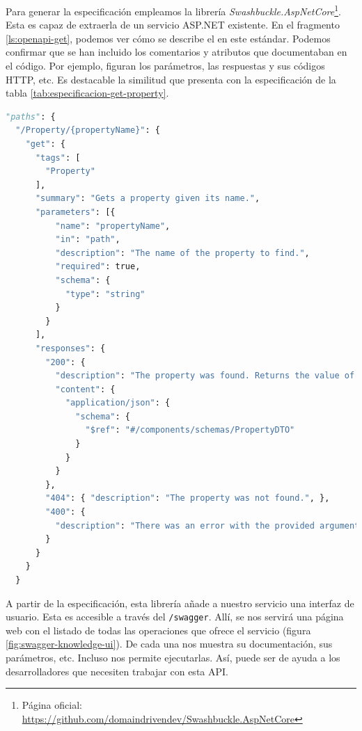 
Para generar la especificación empleamos la librería \emph{Swashbuckle.AspNetCore}\footnote{Página oficial: \url{https://github.com/domaindrivendev/Swashbuckle.AspNetCore}}. Esta es capaz de extraerla de un servicio ASP.NET existente. En el fragmento \ref{ls:openapi-get}, podemos ver cómo se describe el  en este estándar. Podemos confirmar que se han incluido los comentarios y atributos que documentaban en el código. Por ejemplo, figuran los parámetros, las respuestas y sus códigos HTTP, etc. Es destacable la similitud que presenta con la especificación de la tabla \ref{tab:especificacion-get-property}.

\begin{lstlisting}[language=python,caption={Especificación OpenAPI del método para obtener una propiedad del conocimiento (\lstinline{GetProperty}). \protect\footnotemark},captionpos=b, label=ls:openapi-get]
"paths": {
  "/Property/{propertyName}": {
    "get": {
      "tags": [
        "Property"
      ],
      "summary": "Gets a property given its name.",
      "parameters": [{
          "name": "propertyName",
          "in": "path",
          "description": "The name of the property to find.",
          "required": true,
          "schema": {
            "type": "string"
          }
        }
      ],
      "responses": {
        "200": {
          "description": "The property was found. Returns the value of the property.",
          "content": {
            "application/json": {
              "schema": {
                "$ref": "#/components/schemas/PropertyDTO"
              }
            }
          }
        },
        "404": { "description": "The property was not found.", },
        "400": {
          "description": "There was an error with the provided arguments.",
        }
      }
    }
  }
\end{lstlisting}


A partir de la especificación, esta librería añade a nuestro servicio una interfaz de usuario. Esta es accesible a través del  \texttt{/swagger}. Allí, se nos servirá una página web con el listado de todas las operaciones que ofrece el servicio (figura \ref{fig:swagger-knowledge-ui}). De cada una nos muestra su documentación, sus parámetros, etc. Incluso nos permite ejecutarlas. Así, puede ser de ayuda a los desarrolladores que necesiten trabajar con esta API.


